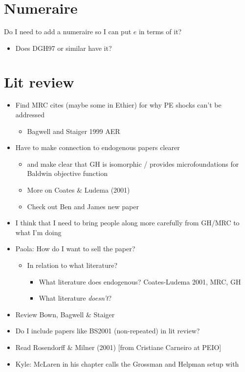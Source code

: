 \documentclass[12pt]{article}
\begin{document}
\section{Numeraire}
Do I need to add a numeraire so I can put $e$ in terms of it?
\begin{itemize}
	\item Does DGH97 or similar have it?
\end{itemize}


\section{Lit review}
\begin{itemize}
	\item Find MRC cites (maybe some in Ethier) for why PE shocks can't be addressed
		\begin{itemize}
			\item Bagwell and Staiger 1999 AER
		\end{itemize}
	\item Have to make connection to endogenous papers clearer
		\begin{itemize}
			\item and make clear that GH is isomorphic / provides microfoundations for Baldwin objective function
			\item More on Coates $\&$ Ludema (2001)
			\item Check out Ben and James new paper
		\end{itemize}
	\item I think that I need to bring people along more carefully from GH/MRC to what I'm doing
	\item Paola: How do I want to sell the paper?
		\begin{itemize}
			\item In relation to what literature?
				\begin{itemize}
					\item What literature does endogenous? Coates-Ludema 2001, MRC, GH
					\item What literature \textit{doesn't}?
				\end{itemize}
			\end{itemize}
	\item Review Bown, Bagwell $\&$ Staiger
	\item Do I include papers like BS2001 (non-repeated) in lit review?
	\item Read Rosendorff $\&$ Milner (2001) [from Cristiane Carneiro at PEIO]
	\item Kyle: McLaren in his chapter calls the Grossman and Helpman setup with

\end{itemize}
\end{document}

